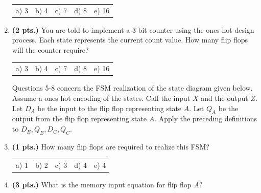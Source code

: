 \documentclass{article}
\begin{document}
\begin{enumerate}
\begin{tabular}{p{0.75in}p{0.75in}p{0.75in}p{0.75in}p{0.75in}}
a) 3 & b) 4 & c) 7 & d) 8 & e) 16 \\
\end{tabular}

\item {\bf (2 pts.)} You are told to implement a 3 bit counter using the
ones hot design process.  Each state represents the current count value. 
How many flip flops will the counter require?

\begin{tabular}{p{0.75in}p{0.75in}p{0.75in}p{0.75in}p{0.75in}}
a) 3 & b) 4 & c) 7 & d) 8 & e) 16 \\
\end{tabular}

\pagebreak
Questions 5-8 concern the FSM realization of the state diagram given below.
Assume a ones hot encoding of the states.  Call the input $X$ and the output
$Z$.  Let $D_A$ be the input to the flip flop representing state $A$.  Let $Q_A$
be the output from the flip flop representing state $A$.  Apply the preceding
definitions to $D_B, Q_B, D_C, Q_C$.

\item {\bf (1 pts.)} How many flip flops are required to realize this FSM?

\begin{tabular}{p{0.75in}p{0.75in}p{0.75in}p{0.75in}p{0.75in}}
a) 1 & b) 2 & c) 3 & d) 4 & e) 4 \\
\end{tabular}

\item {\bf (3 pts.)} What is the memory input equation for flip flop $A$?


\end{enumerate}
\end{document}
